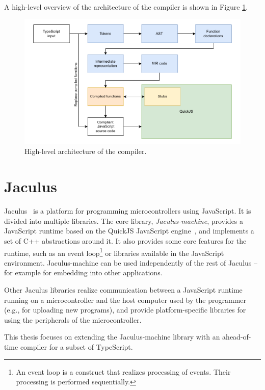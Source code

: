 A high-level overview of the architecture of the compiler is shown in Figure \ref{fig:architecture}.

\begin{figure}
    \centering
    \includegraphics[width=\textwidth, draft=false]{assets/img/architecture.pdf}
    \caption{High-level architecture of the compiler.}
    \label{fig:architecture}
\end{figure}


\section{Jaculus}\label{jaculus}

Jaculus~\cite{jaculusthesis} is a platform for programming microcontrollers using JavaScript. It is divided into multiple libraries. The core library, \textit{Jaculus-machine}, provides a JavaScript runtime based on the QuickJS JavaScript engine~\cite{quickjs}, and implements a set of C++ abstractions around it. It also provides some core features for the runtime, such as an event loop\footnote{An event loop is a construct that realizes processing of events. Their processing is performed sequentially.} or libraries available in the JavaScript environment. Jaculus-machine can be used independently of the rest of Jaculus -- for example for embedding into other applications.

Other Jaculus libraries realize communication between a JavaScript runtime running on a microcontroller and the host computer used by the programmer (e.g., for uploading new programs), and provide platform-specific libraries for using the peripherals of the microcontroller.

This thesis focuses on extending the Jaculus-machine library with an ahead-of-time compiler for a subset of TypeScript.


